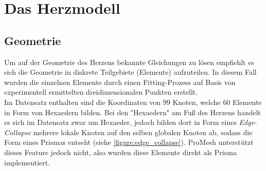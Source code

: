 \documentclass[
	a4paper,			%
	11pt,				%
	headsepline,		%
	bibtotoc,			%
	BCOR18mm,      		%
	DIV14,				%
	headings=normal,
	numbers=noenddot,
]{scrbook}
\theoremstyle{mythmstyle}
\theoremstyle{other}
\begin{document}
	\chapter{Das Herzmodell}
	\section{Geometrie}
		Um auf der Geometrie des Herzens bekannte Gleichungen zu lösen empfiehlt
		es sich die Geometrie in diskrete Teilgebiete (Elemente) aufzuteilen. 
		In diesem Fall wurden die einzelnen Elemente durch einen 
		Fitting-Prozess auf Basis von experimentell ermittelten dreidimensionalen
		Punkten erstellt.\cite{paper1} \\
		Im Datensatz enthalten sind die Koordinaten von 99 Knoten, welche 60 Elemente in Form von
		Hexaedern bilden. Bei den "Hexaedern" am Fuß des Herzens handelt es sich im Datensatz zwar um
		Hexaeder, jedoch bilden dort in Form eines \emph{Edge-Collapse} mehrere lokale Knoten auf den selben
		globalen Knoten ab, sodass die Form eines Prismas entseht (siehe \autoref{figure:edge_collapse}).
		ProMesh unterstützt dieses Feature jedoch nicht, also wurden diese Elemente direkt als Prisma 
		implementiert. 
		
\end{document}
